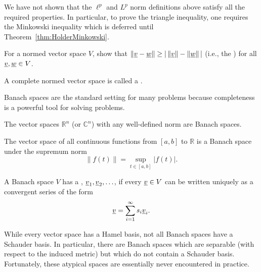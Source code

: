 \begin{remark}
We have not shown that the $\ell^p$ and $L^p$ norm definitions above satisfy all the required properties.
In particular, to prove the triangle inequality, one requires the Minkowski inequality which is deferred until Theorem~\ref{thm:HolderMinkowski}.
\end{remark}

\begin{problem}
For a normed vector space $V$, show that $\| \underline{v} - \underline{w} \| \geq | \,  \| \underline{v} \| - \| \underline{w} \| \, |$ (i.e., the ) for all $\underline{v},\underline{w} \in V$.
\end{problem}

\begin{definition}
A complete normed vector space is called a .
\end{definition}

Banach spaces are the standard setting for many problems because completeness is a powerful tool for solving problems.

\begin{example}
The vector spaces $\mathbb{R}^n$ (or $\mathbb{C}^n$) with any well-defined norm are Banach spaces.
\end{example}

\begin{example}
The vector space of all continuous functions from $[a,b]$ to $\mathbb{R}$ is a Banach space under the supremum norm
\[ \left\| f(t) \right\| = \sup_{t\in [a,b]} |f(t)|. \]
\end{example}

\begin{definition}
A Banach space $V$ has a , $\underline{v}_1, \underline{v}_2, \ldots$, if every $\underline{v} \in V$ can be written uniquely as a convergent series of the form
\[ \underline{v} = \sum_{i=1}^\infty s_i \underline{v}_i. \]
\end{definition}

\begin{remark}
While every vector space has a Hamel basis, not all Banach spaces have a Schauder basis.
In particular, there are Banach spaces which are separable (with respect to the induced metric) but which do not contain a Schauder basis.
Fortunately, these atypical spaces are essentially never encountered in practice.
\end{remark}

